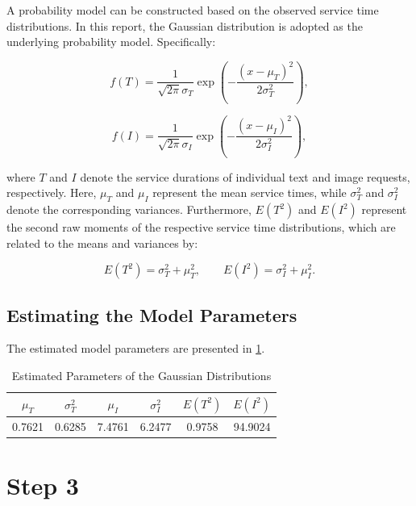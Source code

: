 \documentclass[10pt,a4paper]{article}
\begin{document}
	A probability model can be constructed based on the observed service time distributions. In this report, the Gaussian distribution is adopted as the underlying probability model. Specifically:
	
	\[
	f(T)=\frac{1}{\sqrt{2\pi}\sigma_T}
	\exp\left(-\frac{(x-\mu_T)^2}{2\sigma_T^2}\right),
	\]
	
	\[
	f(I)=\frac{1}{\sqrt{2\pi}\sigma_I}
	\exp\left(-\frac{(x-\mu_I)^2}{2\sigma_I^2}\right),
	\]
	
	where $T$ and $I$ denote the service durations of individual text and image requests, respectively. Here, $\mu_T$ and $\mu_I$ represent the mean service times, while $\sigma_T^2$ and $\sigma_I^2$ denote the corresponding variances. Furthermore, $E(T^2)$ and $E(I^2)$ represent the second raw moments of the respective service time distributions, which are related to the means and variances by:
	
	\[
	E(T^2)=\sigma_T^2+\mu_T^2,
	\qquad
	E(I^2)=\sigma_I^2+\mu_I^2.
	\]
	
	\subsection{Estimating the Model Parameters}
	
	The estimated model parameters are presented in \cref{tab:gaussian_estimation}.
	
	\begin{table}[H]
		\centering
		\caption{Estimated Parameters of the Gaussian Distributions}
		\label{tab:gaussian_estimation}
		\begin{tabular}{cccccc}
			\hline
			$\mu_T$ & $\sigma_T^2$ & $\mu_I$ & $\sigma_I^2$ & $E(T^2)$ & $E(I^2)$\\
			\hline
			0.7621 & 0.6285 & 7.4761 & 6.2477 & 0.9758 & 94.9024\\
			\hline
		\end{tabular}
	\end{table}
	
	\section{Step 3}
\end{document}
